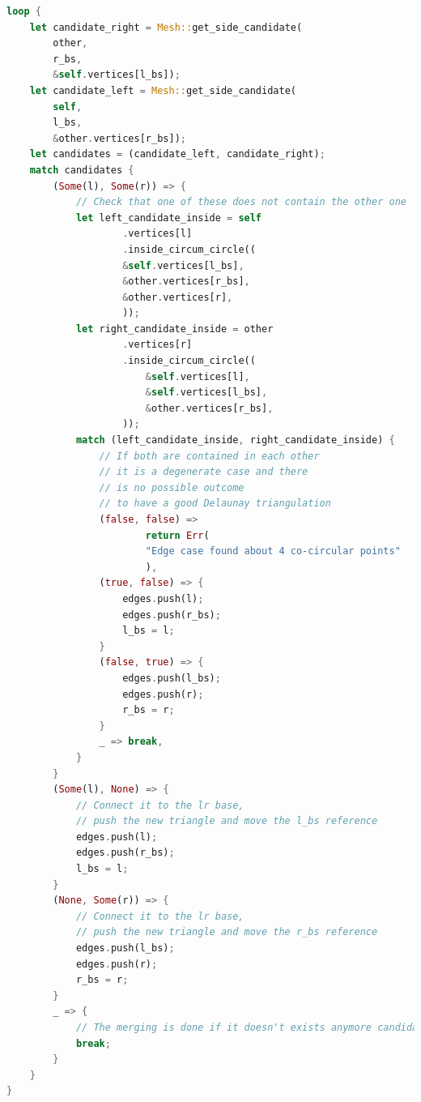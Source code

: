 \begin{lstlisting}[language=Rust, style=boxed]
loop {
    let candidate_right = Mesh::get_side_candidate(
        other,
        r_bs,
        &self.vertices[l_bs]);
    let candidate_left = Mesh::get_side_candidate(
        self,
        l_bs,
        &other.vertices[r_bs]);
    let candidates = (candidate_left, candidate_right);
    match candidates {
        (Some(l), Some(r)) => {
            // Check that one of these does not contain the other one
            let left_candidate_inside = self
					.vertices[l]
					.inside_circum_circle((
					&self.vertices[l_bs],
					&other.vertices[r_bs],
					&other.vertices[r],
					));
            let right_candidate_inside = other
                    .vertices[r]
                    .inside_circum_circle((
                        &self.vertices[l],
                        &self.vertices[l_bs],
                        &other.vertices[r_bs],
                    ));
            match (left_candidate_inside, right_candidate_inside) {
                // If both are contained in each other
                // it is a degenerate case and there
                // is no possible outcome
                // to have a good Delaunay triangulation
                (false, false) => 
                        return Err(
                        "Edge case found about 4 co-circular points"
                        ),
                (true, false) => {
                    edges.push(l);
                    edges.push(r_bs);
                    l_bs = l;
                }
                (false, true) => {
                    edges.push(l_bs);
                    edges.push(r);
                    r_bs = r;
                }
                _ => break,
            }
        }
        (Some(l), None) => {
            // Connect it to the lr base,
            // push the new triangle and move the l_bs reference
            edges.push(l);
            edges.push(r_bs);
            l_bs = l;
        }
        (None, Some(r)) => {
            // Connect it to the lr base, 
            // push the new triangle and move the r_bs reference
            edges.push(l_bs);
            edges.push(r);
            r_bs = r;
        }
        _ => {
            // The merging is done if it doesn't exists anymore candidates
            break;
        }
    }
}
\end{lstlisting}

% 
% 
